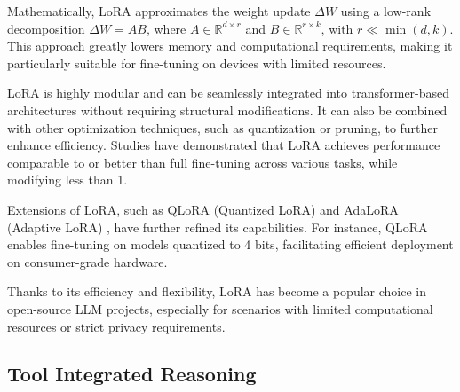 Mathematically, LoRA approximates the weight update $\Delta W$ using a low-rank decomposition $\Delta W = A B$, where $A \in \mathbb{R}^{d \times r}$ and $B \in \mathbb{R}^{r \times k}$, with $r \ll \min(d,k)$. This approach greatly lowers memory and computational requirements, making it particularly suitable for fine-tuning on devices with limited resources.

LoRA is highly modular and can be seamlessly integrated into transformer-based architectures without requiring structural modifications. It can also be combined with other optimization techniques, such as quantization or pruning, to further enhance efficiency. Studies have demonstrated that LoRA achieves performance comparable to or better than full fine-tuning across various tasks, while modifying less than 1.%

Extensions of LoRA, such as QLoRA (Quantized LoRA) \citep{Dettmers2023QLoRA} and AdaLoRA (Adaptive LoRA) \citep{Zhang2023AdaLora}, have further refined its capabilities. For instance, QLoRA enables fine-tuning on models quantized to 4 bits, facilitating efficient deployment on consumer-grade hardware.  %

Thanks to its efficiency and flexibility, LoRA has become a popular choice in open-source LLM projects, especially for scenarios with limited computational resources or strict privacy requirements.



\subsection{Tool Integrated Reasoning}


